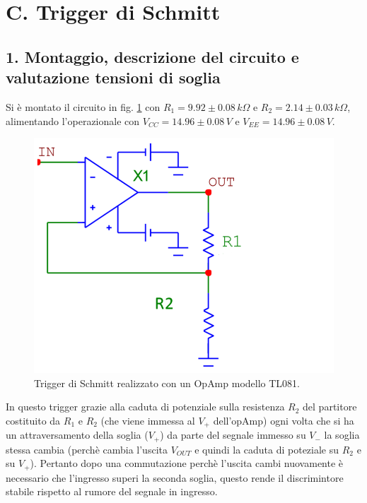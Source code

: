\documentclass[10pt,a4paper]{article}
\begin{document}
\section*{C. Trigger di Schmitt}
\subsection{1. Montaggio, descrizione del circuito e valutazione tensioni di soglia}
Si è montato il circuito in fig. \ref{circuito3} con $R_1 = 9.92\pm0.08 \, k\Omega$ e $R_2 = 2.14 \pm 0.03 \, k\Omega$, alimentando l'operazionale con $V_{CC} = 14.96\pm0.08 \, V$ e $V_{EE} = 14.96 \pm 0.08 \, V$.\\

\begin{figure}[htb!]
\centering
\includegraphics[scale=0.5]{triggerSchmitt.png}
\caption{Trigger di Schmitt realizzato con un OpAmp modello TL081.\label{circuito3}}
\end{figure}

In questo trigger grazie alla caduta di potenziale sulla resistenza $R_2$ del partitore costituito da $R_1$ e $R_2$ (che viene immessa al $V_{+}$ dell'opAmp) ogni volta che si ha un attraversamento della soglia ($V_{+}$) da parte del segnale immesso su $V_{-}$ la soglia stessa cambia (perchè cambia l'uscita $V_{OUT}$ e quindi la caduta di poteziale su $R_2$ e su $V_{+}$). Pertanto dopo una commutazione perchè l'uscita cambi nuovamente è necessario che l'ingresso superi la seconda soglia, questo rende il discrimintore stabile rispetto al rumore del segnale in ingresso.
\end{document}
